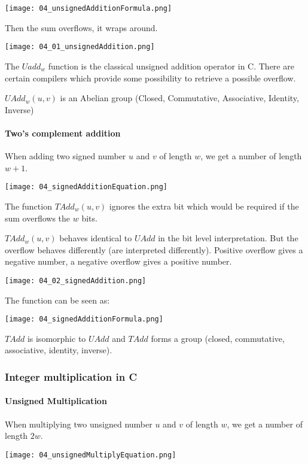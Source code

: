 \texttt{[image: 04\_unsignedAdditionFormula.png]}

Then the sum overflows, it wraps around.

\texttt{[image: 04\_01\_unsignedAddition.png]}

The $Uadd_w$ function is the classical unsigned addition operator in C. There are certain compilers which provide some possibility to retrieve a possible overflow.

$UAdd_w(u,v)$ is an Abelian group (Closed, Commutative, Associative, Identity, Inverse)

\paragraph{Two's complement addition}
When adding two signed number $u$ and $v$ of length $w$, we get a number of length $w + 1$.

\texttt{[image: 04\_signedAdditionEquation.png]}

The function $TAdd_w(u,v)$ ignores the extra bit which would be required if the sum overflows the $w$ bits.

$TAdd_w(u,v)$ behaves identical to $UAdd$ in the bit level interpretation. But the overflow behaves differently (are interpreted differently). Positive overflow gives a negative number, a negative overflow gives a positive number.

\texttt{[image: 04\_02\_signedAddition.png]}

The function can be seen as:

\texttt{[image: 04\_signedAdditionFormula.png]}

$TAdd$ is isomorphic to $UAdd$ and $TAdd$ forms a group (closed, commutative, associative, identity, inverse).

\subsubsection{Integer multiplication in C}

\paragraph{Unsigned Multiplication}
When multiplying two unsigned number $u$ and $v$ of length $w$, we get a number of length $2w$.

\texttt{[image: 04\_unsignedMultiplyEquation.png]}

